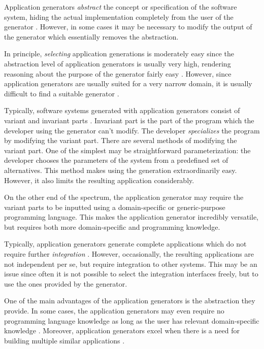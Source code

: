 Application generators \emph{abstract} the concept or specification of the software system, hiding the actual implementation completely from the user of the generator \citep{cleaveland_building_1988}. However, in some cases it may be necessary to modify the output of the generator which essentially removes the abstraction.

In principle, \emph{selecting} application generations is moderately easy since the abstraction level of application generators is usually very high, rendering reasoning about the purpose of the generator fairly easy \citep[chap.~7]{krueger_software_1992}. However, since application generators are usually suited for a very narrow domain, it is usually difficult to find a suitable generator \citep[chap.~7]{krueger_software_1992}.

Typically, software systems generated with application generators consist of variant and invariant parts \citep[chap.~7]{krueger_software_1992}. Invariant part is the part of the program which the developer using the generator can't modify. The developer \emph{specializes} the program by modifying the variant part. There are several methods of modifying the variant part. One of the simplest may be straightforward parameterization: the developer chooses the parameters of the system from a predefined set of alternatives. This method makes using the generation extraordinarily easy. However, it also limits the resulting application considerably.

On the other end of the spectrum, the application generator may require the variant parts to be inputted using a domain-specific or generic-purpose programming language. This makes the application generator incredibly versatile, but requires both more domain-specific and programming knowledge.

Typically, application generators generate complete applications which do not require further \emph{integration} \citep[chap.~7]{krueger_software_1992}. However, occasionally, the resulting applications are not independent per se, but require integration to other systems. This may be an issue since often it is not possible to select the integration interfaces freely, but to use the ones provided by the generator.

One of the main advantages of the application generators is the abstraction they provide. In some cases, the application generators may even require no programming language knowledge as long as the user has relevant domain-specific knowledge \citep{horowitz_survey_1985}. Moreover, application generators excel when there is a need for building multiple similar applications \citep[chap.~7]{krueger_software_1992}. 


